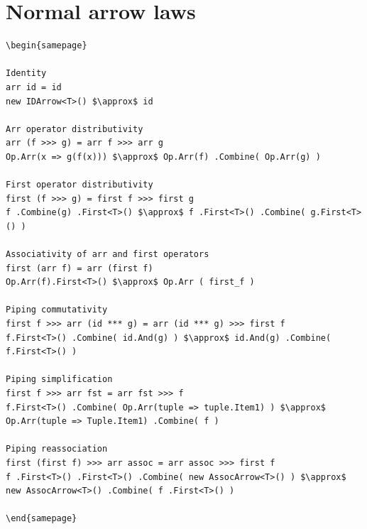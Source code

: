 \documentclass[12pt,twoside,notitlepage]{report}
\begin{document}
\section{Normal arrow laws}

\begin{lstlisting}[mathescape]
\begin{samepage}

Identity
arr id = id
new IDArrow<T>() $\approx$ id

Arr operator distributivity
arr (f >>> g) = arr f >>> arr g
Op.Arr(x => g(f(x))) $\approx$ Op.Arr(f) .Combine( Op.Arr(g) )

First operator distributivity
first (f >>> g) = first f >>> first g
f .Combine(g) .First<T>() $\approx$ f .First<T>() .Combine( g.First<T>() )

Associativity of arr and first operators
first (arr f) = arr (first f)
Op.Arr(f).First<T>() $\approx$ Op.Arr ( first_f )

Piping commutativity
first f >>> arr (id *** g) = arr (id *** g) >>> first f
f.First<T>() .Combine( id.And(g) ) $\approx$ id.And(g) .Combine( f.First<T>() )

Piping simplification
first f >>> arr fst = arr fst >>> f
f.First<T>() .Combine( Op.Arr(tuple => tuple.Item1) ) $\approx$ Op.Arr(tuple => Tuple.Item1) .Combine( f )

Piping reassociation
first (first f) >>> arr assoc = arr assoc >>> first f
f .First<T>() .First<T>() .Combine( new AssocArrow<T>() ) $\approx$ new AssocArrow<T>() .Combine( f .First<T>() )

\end{samepage}
\end{lstlisting}

\cleardoublepage
\end{document}
